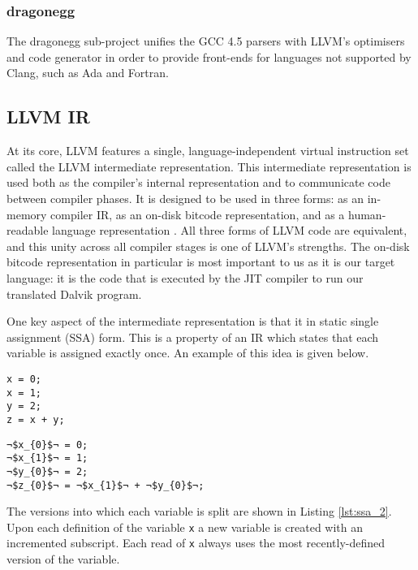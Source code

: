 \subsubsection*{dragonegg}

The dragonegg sub-project unifies the GCC 4.5 parsers with LLVM's optimisers and code generator in order to provide front-ends for languages not supported by Clang, such as Ada and Fortran.

\subsection*{LLVM IR}

At its core, LLVM features a single, language-independent virtual instruction set called the LLVM intermediate representation. This intermediate representation is used both as the compiler's internal representation and to communicate code between compiler phases. It is designed to be used in three forms: as an in-memory compiler IR, as an on-disk bitcode representation, and as a human-readable language representation \cite{llvm_ref}. All three forms of LLVM code are equivalent, and this unity across all compiler stages is one of LLVM's strengths. The on-disk bitcode representation in particular is most important to us as it is our target language: it is the code that is executed by the JIT compiler to run our translated Dalvik program.

One key aspect of the intermediate representation is that it in static single assignment (SSA) form. This is a property of an IR which states that each variable is assigned exactly once. An example of this idea is given below.

\lstset{
	language=C,
	basicstyle=\small,
	stringstyle=\ttfamily
}

\begin{lstlisting}[frame=single, caption={Code for SSA example}, label=lst:ssa_1]
x = 0;
x = 1;
y = 2;
z = x + y;
\end{lstlisting}


\begin{lstlisting}[frame=single, escapechar={¬}, caption={Example of SSA form}, label=lst:ssa_2]
¬$x_{0}$¬ = 0;
¬$x_{1}$¬ = 1;
¬$y_{0}$¬ = 2;
¬$z_{0}$¬ = ¬$x_{1}$¬ + ¬$y_{0}$¬;
\end{lstlisting}

The versions into which each variable is split are shown in Listing \ref{lst:ssa_2}. Upon each definition of the variable \verb|x| a new variable is created with an incremented subscript. Each read of \verb|x| always uses the most recently-defined version of the variable.


